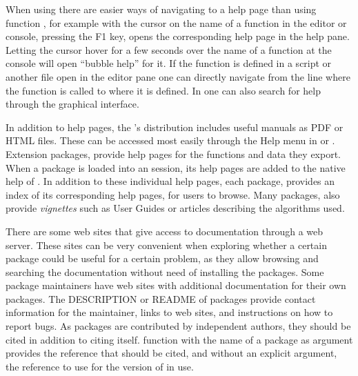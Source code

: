 \documentclass[krantz2]{krantz}\usepackage{knitr}%
\begin{document}
When using \RStudio there are easier ways of navigating to a help page than using function , for example with the cursor on the name of a function in the editor or console, pressing the F1 key, opens the corresponding help page in the help pane. Letting the cursor hover for a few seconds over the name of a function at the \Rpgrm console will open ``bubble help'' for it. If the function is defined in a script or another file open in the editor pane one can directly navigate from the line where the function is called to where it is defined. In \RStudio one can also search for help through the graphical interface.

In addition to help pages, the \Rpgrm's distribution includes useful manuals as PDF or HTML files. These can be accessed most easily through the Help menu in \RStudio or . Extension packages, provide help pages for the functions and data they export. When a package is loaded into an \Rpgrm session, its help pages are added to the native help of \Rpgrm. In addition to these individual help pages, each package, provides an index of its corresponding help pages, for users to browse. Many packages, also provide \emph{vignettes} such as User Guides or articles describing the algorithms used.

There are some web sites that give access to \Rlang documentation through a web server. These sites can be very convenient when exploring whether a certain package could be useful for a certain problem, as they allow browsing and searching the documentation without need of installing the packages. Some package maintainers have web sites with additional documentation for their own packages. The DESCRIPTION or README of packages provide contact information for the maintainer, links to web sites, and instructions on how to report bugs. As packages are contributed by independent authors, they should be cited in addition to citing \Rpgrm itself. \Rlang function  with the name of a package as argument provides the reference that should be cited, and without an explicit argument, the reference to use for the version of \Rlang in use.
\end{document}
